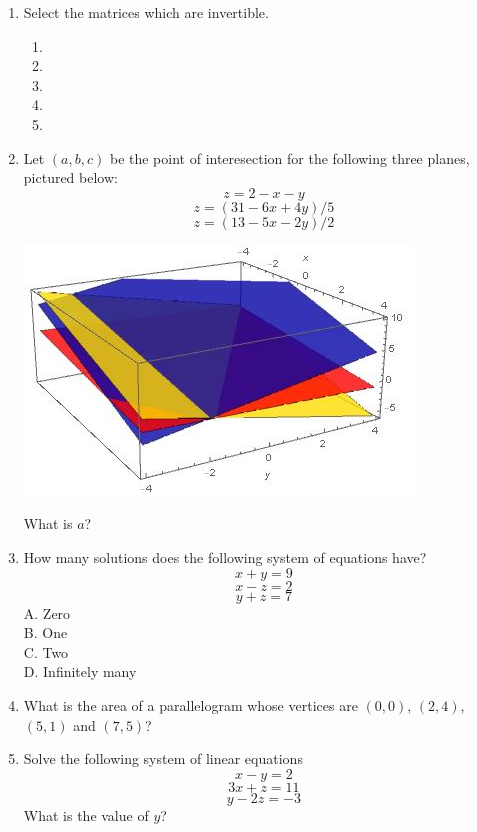 \begin{enumerate}
    \item Select the matrices which are invertible.
    \begin{enumerate}
        \item {}
        \item {}
        \item {}
        \item {}
        \item {}
    \end{enumerate}
    
    \item Let $(a,b,c)$ be the point of interesection for the following three planes, pictured below:
    $$z = 2 -x -y$$
    $$z = (31-6x+4y)/5$$
    $$z = (13 - 5x - 2y)/2$$
    \begin{center}
        \includegraphics[scale=0.7]{FacesNight3/figs/planes.jpg}
    \end{center}
    What is $a$?
    
    \item How many solutions does the following system of equations have?
    $$x+y=9$$
    $$x-z = 2$$
    $$y+z=7$$
    A. Zero\\
    B. One\\
    C. Two\\
    D. Infinitely many
    
    \item What is the area of a parallelogram whose vertices are $(0,0)$, $(2,4)$, $(5,1)$ and $(7,5)$?
    
    \item Solve the following system of linear equations
    $$x-y=2$$
    $$3x+z=11$$
    $$y-2z=-3$$
    What is the value of $y$?
    
\end{enumerate}

\pagebreak
\shipoutAnswer